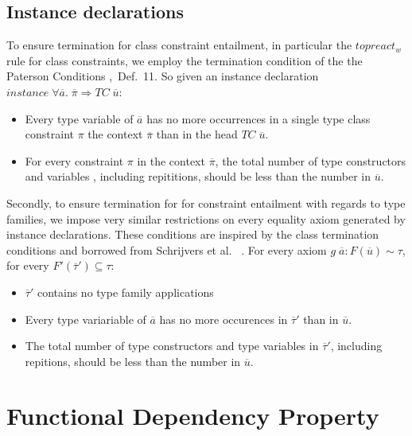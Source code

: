 \subsection{Instance declarations}
To ensure termination for class constraint entailment, in particular the
$topreact_w$ rule for class constraints, we employ the termination condition of
the the Paterson Conditions \cite{fundeps-chrs},~Def.~11. So given an instance
declaration $instance \; \forall \overline{a}. \; \overline{\pi} \Rightarrow TC
\; \overline{u}$:

\begin{itemize}
    \item Every type variable of $\overline{a}$ has no more occurrences in a
    single type class constraint $\pi$ the context $\overline{\pi}$ than in the
    head $TC \; \overline{u}$.

    \item For every constraint $\pi$ in the context $\overline{\pi}$, the total
    number of type constructors and variables , including repititions, should be
    less than the number in $\overline{u}$.
\end{itemize}

Secondly, to ensure termination for for constraint entailment with regards to
type families, we impose very similar restrictions on every equality axiom
generated by instance declarations. These conditions are inspired by the class
termination conditions and borrowed from Schrijvers et
al.~\cite{type-checking-with-open-type-functions} .
For every axiom $g \; \overline{a} : F(\overline{u}) \sim \tau$, for every
$F'(\overline{\tau}') \subseteq \tau$:
\begin{itemize}
    \item $\overline{\tau}'$ contains no type family applications

    \item Every type variariable of $\overline{a}$ has no more occurences in
    $\overline{\tau}'$ than in $\overline{u}$.

    \item The total number of type constructors and type variables in
    $\overline{\tau}'$, including repitions, should be less than the number in
    $\overline{u}$.
\end{itemize}

\section{Functional Dependency Property}

